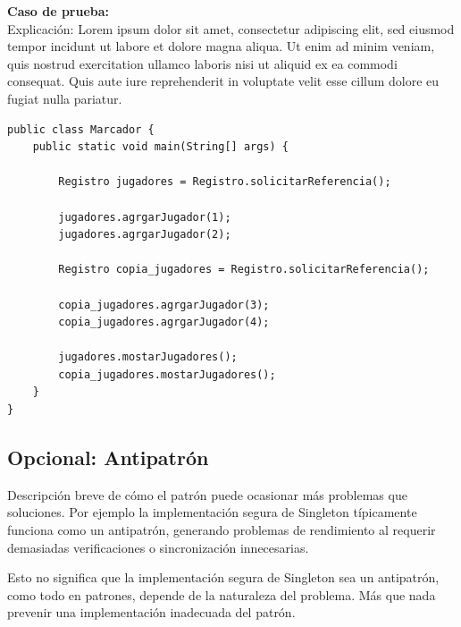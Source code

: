 \documentclass[12pt]{book}
\begin{document}
\newpage

\textbf{Caso de prueba:} \\
Explicación: Lorem ipsum dolor sit amet, consectetur adipiscing elit, sed eiusmod tempor incidunt ut labore et dolore magna aliqua. Ut enim ad minim veniam, quis nostrud exercitation ullamco laboris nisi ut aliquid ex ea commodi consequat. Quis aute iure reprehenderit in voluptate velit esse cillum dolore eu fugiat nulla pariatur.

\begin{verbatim}
public class Marcador {
    public static void main(String[] args) {
    
        Registro jugadores = Registro.solicitarReferencia();
    
        jugadores.agrgarJugador(1);
        jugadores.agrgarJugador(2);
    
        Registro copia_jugadores = Registro.solicitarReferencia();
    
        copia_jugadores.agrgarJugador(3);
        copia_jugadores.agrgarJugador(4);
        
        jugadores.mostarJugadores();
        copia_jugadores.mostarJugadores();	
    }
}
\end{verbatim}


\subsection{Opcional: Antipatrón}
Descripción breve de cómo el patrón puede ocasionar más problemas que soluciones. Por ejemplo la implementación segura de Singleton típicamente funciona como un antipatrón, generando problemas de rendimiento al requerir demasiadas verificaciones o sincronización innecesarias.

Esto no significa que la implementación segura de Singleton sea un antipatrón, como todo en patrones, depende de la naturaleza del problema. Más que nada prevenir una implementación inadecuada del patrón.
\end{document}
